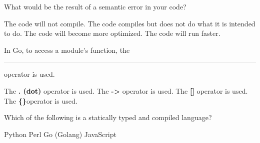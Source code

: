 \documentclass[12pt, addpoints, answers]{exam}
\begin{document}
\begin{questions}
	\question What would be the result of a semantic error in your code?
	\begin{choices}
		\choice The code will not compile.
		\CorrectChoice The code compiles but does not do what it is intended to do.
		\choice The code will become more optimized.
		\choice The code will run faster.
	\end{choices}
				

				

				
	\question In Go, to access a module's function, the \rule{3cm}{0.15mm}  operator is used.
	\begin{choices}
		\CorrectChoice The \textbf{. (dot)} operator is used.
		\choice The \textbf{->} operator is used.
		\choice The \textbf{[]} operator is used.
		\choice The \textbf{\{\}}operator is used.
	\end{choices}
				

		
		
						
		
		        

				
				
	\question Which of the following is a statically typed and compiled language?
	\begin{choices}
		\choice Python
		\choice Perl
		\CorrectChoice Go (Golang)
		\choice JavaScript
	\end{choices}
				

\end{questions}
\end{document}
